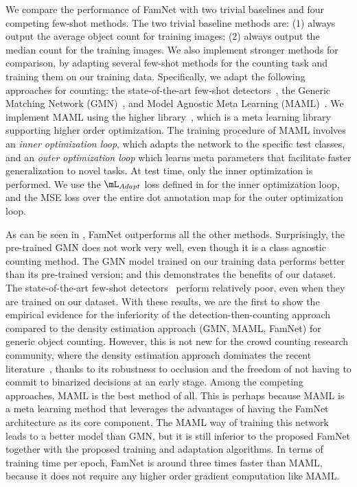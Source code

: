 We compare the performance of FamNet with two trivial baselines and four competing few-shot methods. The two trivial baseline methods are: (1) always output the average object count for training images; (2) always output the median count for the training images. We also implement stronger methods for comparison, by adapting several few-shot methods for the counting task and training them on our training data. Specifically, we adapt the following approaches for counting: the state-of-the-art few-shot detectors~\cite{kang2019few,fan2020few}, the Generic Matching Network (GMN)~\cite{lu2018class}, and Model Agnostic Meta Learning (MAML)~\cite{finn2017model}. 
We implement MAML using the higher library~\cite{grefenstette2019generalized}, which is a meta learning library supporting higher order optimization. The training procedure of MAML involves an \textit{inner optimization loop}, which adapts the network to the specific test classes, and an \textit{outer optimization loop} which learns meta parameters that facilitate faster generalization to novel tasks. At test time, only the inner optimization is performed. We use the $\mL_{Adapt}$ loss defined in  for the inner optimization loop, and the MSE loss over the entire dot annotation map for the outer optimization loop. 

As can be seen in , FamNet outperforms all the other methods. Surprisingly, the pre-trained GMN does not work very well, even though it is a class agnostic counting method. The GMN model trained on our training data performs better than its pre-trained version; and this demonstrates the benefits of our dataset. The state-of-the-art few-shot detectors~\cite{kang2019few,fan2020few} perform relatively poor, even when they are trained on our dataset.
With these results, we are the first to show the empirical evidence for the inferiority of the detection-then-counting approach compared to the density estimation approach (GMN, MAML, FamNet) for generic object counting. However, this is not new for the crowd counting research community, where the density estimation approach dominates the recent literature~\cite{zhang2016single}, thanks to its robustness to occlusion and the freedom of not having to commit to binarized decisions at an early stage. Among the competing approaches, MAML is the best method of all. This is perhaps because MAML is a meta learning method that leverages the advantages of having the FamNet architecture as its core component. The MAML way of training this network leads to a better model than GMN, but it is still inferior to the proposed FamNet together with the proposed training and adaptation algorithms. In terms of training time per epoch, FamNet is around three times faster than MAML, because it does not require any higher order gradient computation like MAML. 

